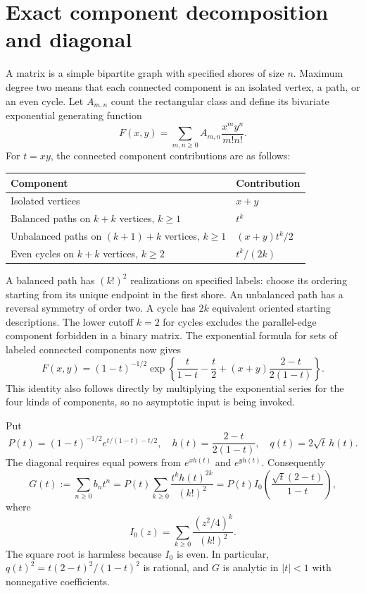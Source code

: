 \documentclass[11pt,letterpaper]{article}
\numberwithin{equation}{section}
\theoremstyle{remark}\newtheorem{remark}[theorem]{Remark}
\begin{document}
\section{Exact component decomposition and diagonal}\label{sbm:sec:exact}
A matrix is a simple bipartite graph with specified shores of size $n$.
Maximum degree two means that each connected component is an isolated
vertex, a path, or an even cycle. Let $A_{m,n}$ count the rectangular
class and define its bivariate exponential generating function
\[
 F(x,y)=\sum_{m,n\geq0}A_{m,n}\frac{x^m y^n}{m!n!}.
\]
For $t=xy$, the connected component contributions are as follows:
\begin{center}
\begin{tabular}{ll}
\toprule
Component & Contribution\\
\midrule
Isolated vertices & $x+y$\\
Balanced paths on $k+k$ vertices, $k\geq1$ & $t^k$\\
Unbalanced paths on $(k+1)+k$ vertices, $k\geq1$
 & $(x+y)t^k/2$\\
Even cycles on $k+k$ vertices, $k\geq2$ & $t^k/(2k)$\\
\bottomrule
\end{tabular}
\end{center}
A balanced path has $(k!)^2$ realizations on specified labels: choose
its ordering starting from its unique endpoint in the first shore.
An unbalanced path has a reversal symmetry of order two. A cycle has
$2k$ equivalent oriented starting descriptions. The lower cutoff
$k=2$ for cycles excludes the parallel-edge component forbidden in a
binary matrix. The exponential formula for sets of labeled connected
components now gives
\begin{equation}\label{sbm:eq:egf}
 F(x,y)=(1-t)^{-1/2}
 \exp\left\{\frac{t}{1-t}-\frac t2
             +(x+y)\frac{2-t}{2(1-t)}\right\}.
\end{equation}
This identity also follows directly by multiplying the exponential
series for the four kinds of components, so no asymptotic input is
being invoked.

Put
\begin{equation}\label{sbm:eq:Pq}
 P(t)=(1-t)^{-1/2}e^{t/(1-t)-t/2},\quad
 h(t)=\frac{2-t}{2(1-t)},\quad
 q(t)=2\sqrt t\,h(t).
\end{equation}
The diagonal requires equal powers from $e^{xh(t)}$ and $e^{yh(t)}$.
Consequently
\begin{equation}\label{sbm:eq:bessel}
 G(t):=\sum_{n\geq0}b_nt^n
   =P(t)\sum_{k\geq0}\frac{t^kh(t)^{2k}}{(k!)^2}
   =P(t)I_0\left(\frac{\sqrt t(2-t)}{1-t}\right),
\end{equation}
where
\[
 I_0(z)=\sum_{k\geq0}\frac{(z^2/4)^k}{(k!)^2}.
\]
The square root is harmless because $I_0$ is even. In particular,
$q(t)^2=t(2-t)^2/(1-t)^2$ is rational, and $G$ is analytic in $|t|<1$
with nonnegative coefficients.
\end{document}
